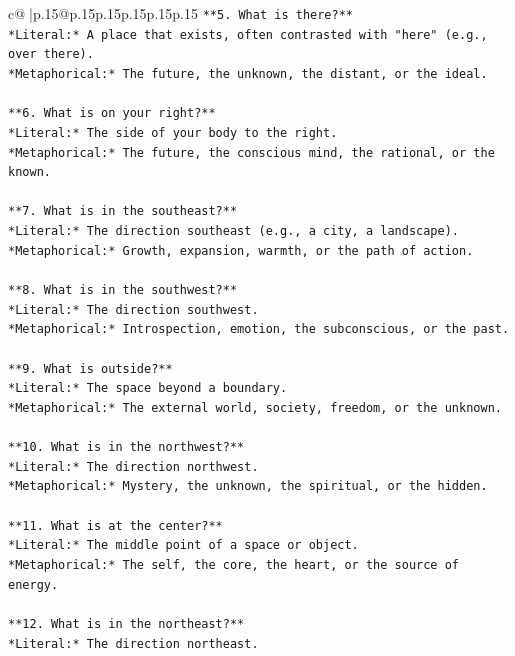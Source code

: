 \documentclass{article}
\begin{document}
{\begin{supertabular}{c@{$\;$}|p{.15\linewidth}@{}p{.15\linewidth}p{.15\linewidth}p{.15\linewidth}p{.15\linewidth}p{.15\linewidth}}
{{{\texttt{**5. What is there?**  } \\
\texttt{*Literal:* A place that exists, often contrasted with "here" (e.g., over there).  } \\
\texttt{*Metaphorical:* The future, the unknown, the distant, or the ideal.} \\
\\ 
\texttt{**6. What is on your right?**  } \\
\texttt{*Literal:* The side of your body to the right.  } \\
\texttt{*Metaphorical:* The future, the conscious mind, the rational, or the known.} \\
\\ 
\texttt{**7. What is in the southeast?**  } \\
\texttt{*Literal:* The direction southeast (e.g., a city, a landscape).  } \\
\texttt{*Metaphorical:* Growth, expansion, warmth, or the path of action.} \\
\\ 
\texttt{**8. What is in the southwest?**  } \\
\texttt{*Literal:* The direction southwest.  } \\
\texttt{*Metaphorical:* Introspection, emotion, the subconscious, or the past.} \\
\\ 
\texttt{**9. What is outside?**  } \\
\texttt{*Literal:* The space beyond a boundary.  } \\
\texttt{*Metaphorical:* The external world, society, freedom, or the unknown.} \\
\\ 
\texttt{**10. What is in the northwest?**  } \\
\texttt{*Literal:* The direction northwest.  } \\
\texttt{*Metaphorical:* Mystery, the unknown, the spiritual, or the hidden.} \\
\\ 
\texttt{**11. What is at the center?**  } \\
\texttt{*Literal:* The middle point of a space or object.  } \\
\texttt{*Metaphorical:* The self, the core, the heart, or the source of energy.} \\
\\ 
\texttt{**12. What is in the northeast?**  } \\
\texttt{*Literal:* The direction northeast.  } \\
}}}
\end{supertabular}}
\end{document}
